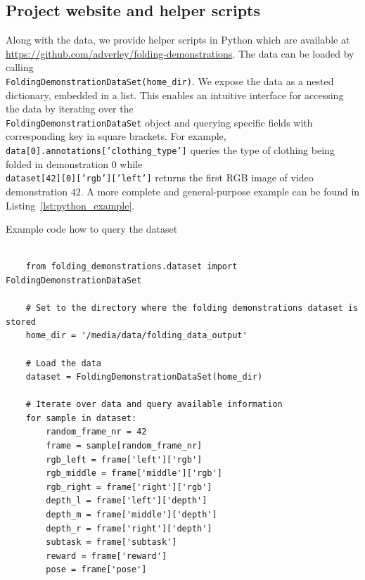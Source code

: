 \documentclass[\home/main.tex]{subfiles}
\begin{document}

\subsection{Project website and helper scripts}
Along with the data, we provide helper scripts in Python which are available at \url{https://github.com/adverley/folding-demonstrations}. The data can be loaded by calling\\\texttt{FoldingDemonstrationDataSet(home_dir)}. We expose the data as a nested dictionary, embedded in a list. This enables an intuitive interface for accessing the data by iterating over the\\\texttt{FoldingDemonstrationDataSet} object and querying specific fields with corresponding key in square brackets. For example,\\\texttt{data[0].annotations['clothing_type']} queries the type of clothing being folded in demonstration $0$ while\\\texttt{dataset[42][0]['rgb']['left']} returns the first RGB image of video demonstration $42$. A more complete and general-purpose example can be found in Listing~\ref{lst:python_example}.

\begin{listing}[htb]
    \caption{Example code how to query the dataset}
    \label{lst:python_example}
    \begin{verbatim}
    
    from folding_demonstrations.dataset import FoldingDemonstrationDataSet

    # Set to the directory where the folding demonstrations dataset is stored
    home_dir = '/media/data/folding_data_output'

    # Load the data
    dataset = FoldingDemonstrationDataSet(home_dir)

    # Iterate over data and query available information
    for sample in dataset:
        random_frame_nr = 42
        frame = sample[random_frame_nr]
        rgb_left = frame['left']['rgb']
        rgb_middle = frame['middle']['rgb']
        rgb_right = frame['right']['rgb']
        depth_l = frame['left']['depth']
        depth_m = frame['middle']['depth']
        depth_r = frame['right']['depth']
        subtask = frame['subtask']
        reward = frame['reward']
        pose = frame['pose']

    \end{verbatim}
\end{listing}
\end{document}
